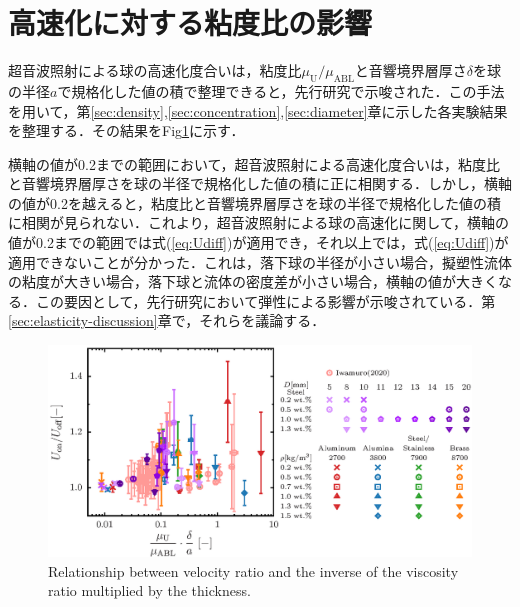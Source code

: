 \section{高速化に対する粘度比の影響}
\label{sec:viscosity}
超音波照射による球の高速化度合いは，粘度比$\mu_\text{U}/\mu_\text{ABL}$と音響境界層厚さ$\delta$を球の半径$a$で規格化した値の積で整理できると，先行研究\cite{ref:8}で示唆された．この手法を用いて，第\ref{sec:density},\ref{sec:concentration},\ref{sec:diameter}章に示した各実験結果を整理する．その結果をFig\ref{fig:viscosity_ratio}に示す．

横軸の値が0.2までの範囲において，超音波照射による高速化度合いは，粘度比と音響境界層厚さを球の半径で規格化した値の積に正に相関する．しかし，横軸の値が0.2を越えると，粘度比と音響境界層厚さを球の半径で規格化した値の積に相関が見られない．これより，超音波照射による球の高速化に関して，横軸の値が0.2までの範囲では式(\ref{eq:Udiff})が適用でき，それ以上では，式(\ref{eq:Udiff})が適用できないことが分かった．これは，落下球の半径が小さい場合，擬塑性流体の粘度が大きい場合，落下球と流体の密度差が小さい場合，横軸の値が大きくなる．この要因として，先行研究\cite{ref:8}において弾性による影響が示唆されている．第\ref{sec:elasticity-discussion}章で，それらを議論する．

\begin{figure}[ht]
    \centering
    \includegraphics[width=1.0\textwidth]{5-Results/viscosity.eps}
    \caption{Relationship between velocity ratio and the inverse of the viscosity ratio multiplied by the thickness.}
    \label{fig:viscosity_ratio}
\end{figure}
